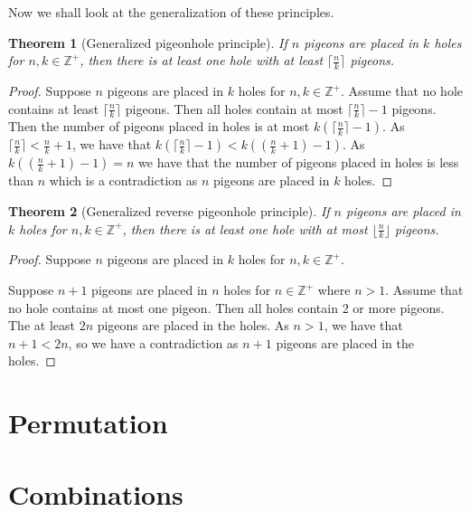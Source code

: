\documentclass[12pt]{article}
\newtheorem{theorem}{Theorem}
\begin{document}
Now we shall look at the generalization of these principles.

\begin{theorem}[Generalized pigeonhole principle]\label{thrm: pigeonhole}
    If $n$ pigeons are placed in $k$ holes for $n,k \in \mathbb{Z}^+$, then there is at least one hole with at least $\lceil \frac{n}{k}\rceil$ pigeons.
\end{theorem}
\begin{proof}
    Suppose $n$ pigeons are placed in $k$ holes for $n,k \in \mathbb{Z}^+$.
    Assume that no hole contains at least $\lceil \frac{n}{k}\rceil$  pigeons. Then all holes contain at most $\lceil \frac{n}{k}\rceil - 1$ pigeons.
    Then the number of pigeons placed in holes is at most $k(\lceil \frac{n}{k}\rceil - 1)$.
    As $\lceil \frac{n}{k}\rceil < \frac{n}{k} + 1$, we have that $k(\lceil \frac{n}{k}\rceil - 1) < k((\frac{n}{k} + 1) - 1)$.
    As $k((\frac{n}{k} + 1) - 1) = n$ we have that the number of pigeons placed in holes is less than $n$ which is a contradiction as $n$ pigeons are placed in $k$ holes.
\end{proof}


\begin{theorem}[Generalized reverse pigeonhole principle]\label{thrm: reverse pigeonhole}
    If $n$ pigeons are placed in $k$ holes for $n,k \in \mathbb{Z}^+$, then there is at least one hole with at most $\lfloor \frac{n}{k}\rfloor$ pigeons.
\end{theorem}
\begin{proof}
    Suppose $n$ pigeons are placed in $k$ holes for $n,k \in \mathbb{Z}^+$.
    

    Suppose $n+1$ pigeons are placed in $n$ holes for $n \in \mathbb{Z}^+$ where $n > 1$.
    Assume that no hole contains at most one pigeon. Then all holes contain 2 or more pigeons.
    The at least $2n$ pigeons are placed in the holes. 
    As $n > 1$, we have that $n+1 < 2n$, so we have a contradiction as $n+1$ pigeons are placed in the holes.
\end{proof}



\section{Permutation}\label{sec: permutation}

\section{Combinations}\label{sec: combination}

\renewcommand\thefootnote{}


\renewcommand\thefootnote{\fnsymbol{footnote}}
\setcounter{footnote}{1}


 


\end{document}
